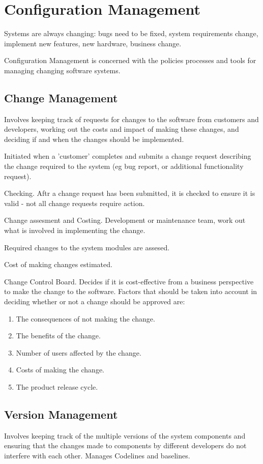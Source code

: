 \documentclass{article}
\begin{document}
 
\setcounter{section}{24}
\section{Configuration Management}
Systems are always changing: bugs need to be fixed, system requirements change, implement new features, new hardware, business change.

Configuration Management is concerned with the policies processes and tools for managing changing software systems.
\subsection{Change Management}
Involves keeping track of requests for changes to the software from customers and developers, working out the costs and impact of making these changes, and deciding if and when the changes should be implemented.

Initiated when a 'customer' completes and submits a change request describing the change required to the system (eg bug report, or additional functionality request).

Checking.  Aftr a change request has been submitted, it is checked to ensure it is valid - not all change requests require action.

Change assesment and Costing.  Development or maintenance team, work out what is involved in implementing the change.

Required changes to the system modules are assesed.

Cost of making changes estimated.

Change Control Board.  Decides if it is cost-effective from a business perspective to make the change to the software.
Factors that should be taken into account in deciding whether or not a change should be approved are:
\begin{enumerate}
\item The consequences of not making the change.
\item The benefits of the change.
\item Number of users affected by the change.
\item Costs of making the change.
\item The product release cycle.
\end{enumerate}

\subsection{Version Management}
Involves keeping track of the multiple versions of the system components and ensuring that the changes made to components by different developers do not interfere with each other.
Manages Codelines and baselines.
\end{document}
